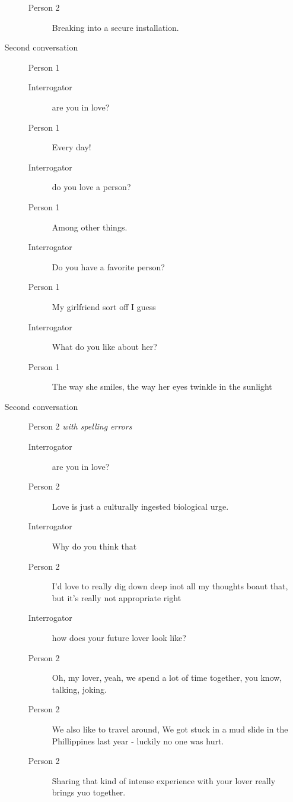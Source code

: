 \begin{itemize}
\begin{description}
\begin{description}
               \item [Person 2] Breaking into a secure installation.
            \end{description}
         \item [Second conversation] Person 1
            \begin{description}
               \item [Interrogator] are you in love?
               \item [Person 1] Every day!
               \item [Interrogator] do you love a person?
               \item [Person 1] Among other things.
               \item [Interrogator] Do you have a favorite person?
               \item [Person 1] My girlfriend sort off I guess
               \item [Interrogator] What do you like about her?
               \item [Person 1] The way she smiles, the way her eyes twinkle in the sunlight
            \end{description}
         \item [Second conversation] Person 2 \textit{with spelling errors}
            \begin{description}
               \item [Interrogator] are you in love?
               \item [Person 2] Love is just a culturally ingested biological urge.
               \item [Interrogator] Why do you think that
               \item [Person 2] I'd love to really dig down deep inot all my thoughts boaut that, but it's really not appropriate right
               \item [Interrogator] how does your future lover look like?
               \item [Person 2] Oh, my lover, yeah, we spend a lot of time together, you know, talking, joking.
               \item [Person 2] We also like to travel around, We got stuck in a mud slide in the Phillippines last year - luckily no one was hurt.
               \item [Person 2] Sharing that kind of intense experience with your lover really brings yuo together.
            \end{description}
      \end{description}


\end{itemize}
